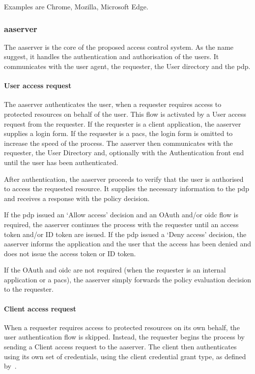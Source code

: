 Examples are Chrome, Mozilla, Microsoft Edge.

\subsubsection{\acrlong{aaserver}} 
The \acrfull{aaserver} is the core of the proposed access control system. As the name suggest, it handles the authentication and authorisation of the users. It communicates with the user agent, the requester, the User directory and the \acrshort{pdp}.
    
\paragraph{User access request}
The \acrshort{aaserver} authenticates the user, when a requester requires access to protected resources on behalf of the user. This flow is activated by a User access request from the requester. If the requester is a client application, the \acrshort{aaserver} supplies a login form. If the requester is a \acrshort{pacs}, the login form is omitted to increase the speed of the process. The \acrshort{aaserver} then communicates with the requester, the User Directory and, optionally with the Authentication front end until the user has been authenticated.

After authentication, the \acrshort{aaserver} proceeds to verify that the user is authorised to access the requested resource. It supplies the necessary information to the \acrshort{pdp} and receives a response with the policy decision.

If the \acrshort{pdp} issued an `Allow access' decision and an OAuth and/or \acrshort{oidc} flow is required, the \acrshort{aaserver} continues the process with the requester until an access token and/or ID token are issued. If the \acrshort{pdp} issued a `Deny access' decision, the \acrshort{aaserver} informs the application and the user that the access has been denied and does not issue the access token or ID token. 

If the OAuth and \acrshort{oidc} are not required (when the requester is an internal application or a \acrshort{pacs}), the \acrshort{aaserver} simply forwards the policy evaluation decision to the requester.

\paragraph{Client access request}
When a requester requires access to protected resources on its own behalf, the user authentication flow is skipped. Instead, the requester begins the process by sending a Client access request to the \acrshort{aaserver}. The client then authenticates using its own set of credentials, using the client credential grant type, as defined by~\cite{Hardt2012TheFramework}. 

